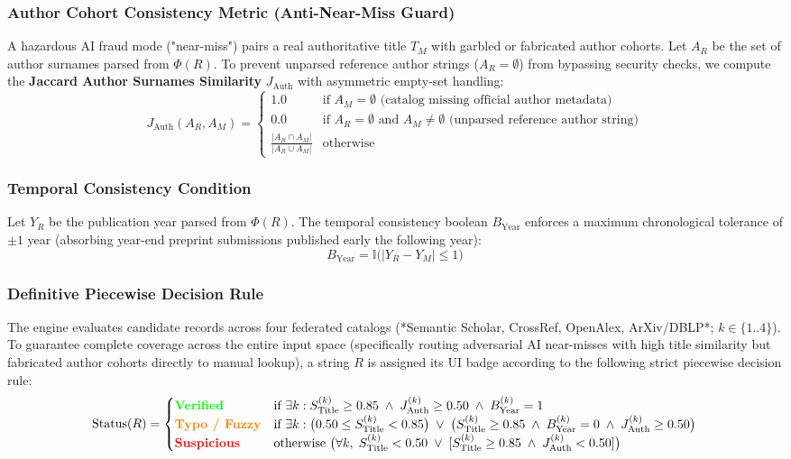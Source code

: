 \documentclass[11pt, a4paper]{article}
\begin{document}
\subsubsection{Author Cohort Consistency Metric (Anti-Near-Miss Guard)}
A hazardous AI fraud mode ("near-miss") pairs a real authoritative title $T_M$ with garbled or fabricated author cohorts. Let $A_R$ be the set of author surnames parsed from $\Phi(R)$. To prevent unparsed reference author strings ($A_R = \emptyset$) from bypassing security checks, we compute the \textbf{Jaccard Author Surnames Similarity} $J_{\text{Auth}}$ with asymmetric empty-set handling:
$$J_{\text{Auth}}(A_R, A_M) = \begin{cases}
1.0 & \text{if } A_M = \emptyset \text{ (catalog missing official author metadata)} \\
0.0 & \text{if } A_R = \emptyset \text{ and } A_M \neq \emptyset \text{ (unparsed reference author string)} \\
\frac{|A_R \cap A_M|}{|A_R \cup A_M|} & \text{otherwise}
\end{cases}$$

\subsubsection{Temporal Consistency Condition}
Let $Y_R$ be the publication year parsed from $\Phi(R)$. The temporal consistency boolean $B_{\text{Year}}$ enforces a maximum chronological tolerance of $\pm 1$ year (absorbing year-end preprint submissions published early the following year):
$$B_{\text{Year}} = \mathbb{I}\big(|Y_R - Y_M| \le 1\big)$$

\subsubsection{Definitive Piecewise Decision Rule}
The engine evaluates candidate records across four federated catalogs (*Semantic Scholar, CrossRef, OpenAlex, ArXiv/DBLP*; $k \in \{1..4\}$). To guarantee complete coverage across the entire input space (specifically routing adversarial AI near-misses with high title similarity but fabricated author cohorts directly to manual lookup), a string $R$ is assigned its UI badge according to the following strict piecewise decision rule:
$$\text{Status}(R) = \begin{cases}
\textcolor{green}{\textbf{Verified}} & \text{if } \exists k : S_{\text{Title}}^{(k)} \ge 0.85 \; \land \; J_{\text{Auth}}^{(k)} \ge 0.50 \; \land \; B_{\text{Year}}^{(k)} = 1 \\
\textcolor{orange}{\textbf{Typo / Fuzzy}} & \text{if } \exists k : \big(0.50 \le S_{\text{Title}}^{(k)} < 0.85\big) \; \lor \; \big(S_{\text{Title}}^{(k)} \ge 0.85 \; \land \; B_{\text{Year}}^{(k)} = 0 \; \land \; J_{\text{Auth}}^{(k)} \ge 0.50\big) \\
\textcolor{red}{\textbf{Suspicious}} & \text{otherwise } \big(\forall k, \; S_{\text{Title}}^{(k)} < 0.50 \; \lor \; [S_{\text{Title}}^{(k)} \ge 0.85 \; \land \; J_{\text{Auth}}^{(k)} < 0.50]\big)
\end{cases}$$
\end{document}
